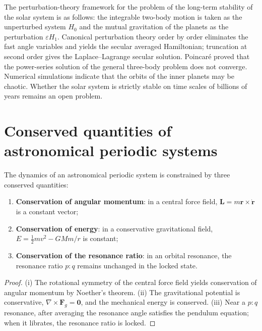 \begin{remark}\label{rem:solar_system_stability}
The perturbation-theory framework for the problem of the long-term stability of the solar system is as follows: the integrable two-body motion is taken as the unperturbed system \(H_0\) and the mutual gravitation of the planets as the perturbation \(\varepsilon H_1\). Canonical perturbation theory order by order eliminates the fast angle variables and yields the secular averaged Hamiltonian; truncation at second order gives the Laplace--Lagrange secular solution. Poincaré proved that the power-series solution of the general three-body problem does not converge. Numerical simulations indicate that the orbits of the inner planets may be chaotic. Whether the solar system is strictly stable on time scales of billions of years remains an open problem.
\end{remark}

\section{Conserved quantities of astronomical periodic systems}

\begin{theorem}\label{thm:astronomical_conservation_laws}
The dynamics of an astronomical periodic system is constrained by three conserved quantities:
\begin{enumerate}[label=(\roman*)]
    \item \textbf{Conservation of angular momentum}: in a central force field, \(\mathbf L=m\mathbf r\times\dot{\mathbf r}\) is a constant vector;
    \item \textbf{Conservation of energy}: in a conservative gravitational field, \(E=\frac12mv^2-GMm/r\) is constant;
    \item \textbf{Conservation of the resonance ratio}: in an orbital resonance, the resonance ratio \(p:q\) remains unchanged in the locked state.
\end{enumerate}
\end{theorem}

\begin{proof}
(i) The rotational symmetry of the central force field yields conservation of angular momentum by Noether's theorem.
(ii) The gravitational potential is conservative, \(\nabla\times\mathbf F_g=\mathbf 0\), and the mechanical energy is conserved.
(iii) Near a \(p:q\) resonance, after averaging the resonance angle satisfies the pendulum equation; when it librates, the resonance ratio is locked.
\end{proof}

